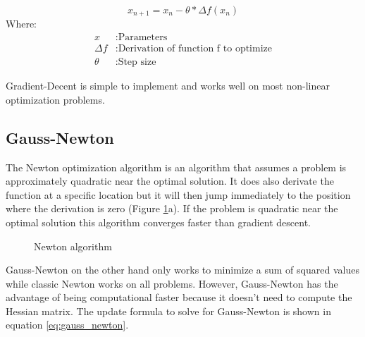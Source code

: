 \documentclass[11pt,a4paper,titlepage,oneside]{report}
\begin{document}
\begin{equation}\label{eq:gradient_descent}
  x_{n+1}=x_n-\theta*\Delta f(x_n)
\end{equation}
Where:
\begin{align*}
  x		      &: \text{Parameters}\\
  \Delta f  &: \text{Derivation of function f to optimize}\\
  \theta    &: \text{Step size}
\end{align*}

Gradient-Decent is simple to implement and works well on most non-linear optimization problems.

\subsection{Gauss-Newton}
The Newton optimization algorithm is an algorithm that assumes a problem is approximately quadratic near the optimal solution. It does also derivate the function at a specific location but it will then jump immediately to the position where the derivation is zero (Figure \ref{fig:newton}a). If the problem is quadratic near the optimal solution this algorithm converges faster than gradient descent.

\begin{figure}[H]
	\centering
	\qquad
	\caption{Newton algorithm}
	\label{fig:newton}
\end{figure}

Gauss-Newton on the other hand only works to minimize a sum of squared values while classic Newton works on all problems. However, Gauss-Newton has the advantage of being computational faster \cite{gauss_newton} because it doesn't need to compute the Hessian matrix. The update formula to solve for Gauss-Newton is shown in equation \ref{eq:gauss_newton}.
\end{document}
